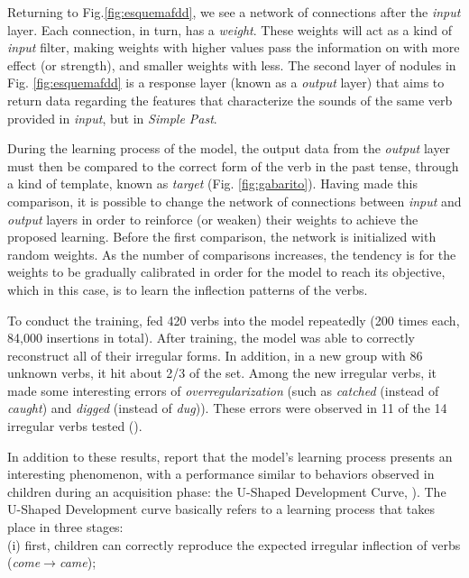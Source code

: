 Returning to Fig.\ref{fig:esquemafdd}, we see a network of connections after the \textit{input} layer. Each connection, in turn, has a \textit{weight}. These weights will act as a kind of \textit{input} filter, making weights with higher values pass the information on with more effect (or strength), and smaller weights with less. The second layer of nodules in Fig. \ref{fig:esquemafdd} is a response layer (known as a \textit{output} layer) that aims to return data regarding the features that characterize the sounds of the same verb provided in \textit{input}, but in \textit{Simple Past}.

During the learning process of the model, the output data from the \textit{output} layer must then be compared to the correct form of the verb in the past tense, through a kind of template, known as \textit{target} (Fig. \ref{fig:gabarito}). Having made this comparison, it is possible to change the network of connections between \textit{input} and \textit{output} layers in order to reinforce (or weaken) their weights to achieve the proposed learning. Before the first comparison, the network is initialized with random weights. As the number of comparisons increases, the tendency is for the weights to be gradually calibrated in order for the model to reach its objective, which in this case, is to learn the inflection patterns of the verbs.



To conduct the training, \cite{rumelhart:1986} fed 420 verbs into the model repeatedly (200 times each, 84,000 insertions in total). After training, the model was able to correctly reconstruct all of their irregular forms. In addition, in a new group with 86 unknown verbs, it hit about 2/3 of the set. Among the new irregular verbs, it made some interesting errors of \textit{overregularization} (such as \textit{catched} (instead of \textit{caught}) and  \textit{digged} (instead of \textit{dug})). These errors were observed in 11 of the 14 irregular verbs tested (\cite{pinker:1993}).

In addition to these results, \cite{rumelhart:1986} report that the model's learning process presents an interesting phenomenon, with a performance similar to behaviors observed in children during an acquisition phase: the U-Shaped Development Curve, \cite{marcus:1992}). The U-Shaped Development curve basically refers to a learning process that takes place in three stages: \\

(i) first, children can correctly reproduce the expected irregular inflection of verbs  (\textit{come}$\rightarrow$\textit{came});

